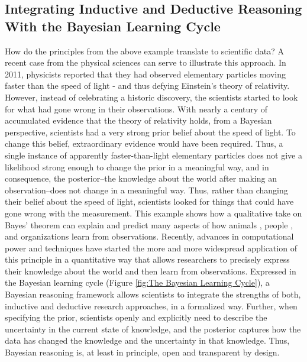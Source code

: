 \documentclass[man]{apa7}
\begin{document}
\subsection{Integrating Inductive and Deductive Reasoning With the Bayesian Learning Cycle}

How do the principles from the above example translate to scientific data? A recent case from the physical sciences can serve to illustrate this approach. In 2011, physicists reported that they had observed elementary particles moving faster than the speed of light \parencite{b11} - and thus defying Einstein’s theory of relativity. However, instead of celebrating a historic discovery, the scientists started to look for what had gone wrong in their observations. With nearly a century of accumulated evidence that the theory of relativity holds, from a Bayesian perspective, scientists had a very strong prior belief about the speed of light. To change this belief, extraordinary evidence would have been required. Thus, a single instance of apparently faster-than-light elementary particles does not give a likelihood strong enough to change the prior in a meaningful way, and in consequence, the posterior--the knowledge about the world after making an observation--does not change in a meaningful way.
Thus, rather than changing their belief about the speed of light, scientists looked for things that could have gone wrong with the measurement. This example shows how a qualitative take on Bayes’ theorem can explain and predict many aspects of how animals \parencite{o13}, people \parencite{tgk06}, and organizations \parencite{kaj12} learn from observations. Recently, advances in computational power and techniques have started the more and more widespread application of this principle in a quantitative way that allows researchers to precisely express their knowledge about the world and then learn from observations. 
Expressed in the Bayesian learning cycle (Figure \ref{fig:The Bayesian Learning Cycle}), a Bayesian reasoning framework allows scientists to integrate the strengths of both, inductive and deductive research approaches, in a formalized way. Further, when specifying the prior, scientists openly and explicitly need to describe the uncertainty in the current state of knowledge, and the posterior captures how the data has changed the knowledge and the uncertainty in that knowledge. Thus, Bayesian reasoning is, at least in principle, open and transparent by design.
\end{document}
